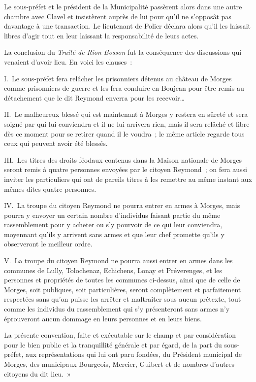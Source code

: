 \documentclass[french,twoside]{book} %
\begin{document}
\noindent Le sous-préfet et le président de la Municipalité passèrent alors dans une autre chambre avec Clavel et insistèrent auprès de lui pour qu’il ne s’opposât pas davantage à une transaction. Le lieutenant de Polier déclara alors qu’il les laissait libres d’agir tout en leur laissant la responsabilité de leurs actes.\par
La conclusion du \emph{Traité de Rion-Bosson} fut la conséquence des discussions qui venaient d’avoir lieu. En voici les clauses :\par
I. Le sous-préfet fera relâcher les prisonniers détenus au château de Morges comme prisonniers de guerre et les fera conduire en Boujean pour être remis au détachement que le dit Reymond enverra pour les recevoir…\par
II. Le malheureux blessé qui est maintenant à Morges y restera en sûreté et sera soigné par qui lui conviendra et il ne lui arrivera rien, mais il sera relâché et libre dès ce moment pour se retirer quand il le voudra ; le même article regarde tous ceux qui peuvent avoir été blessés.\par
III. Les titres des droits féodaux contenus dans la Maison nationale de Morges seront remis à quatre personnes envoyées par le citoyen Reymond ; on fera aussi inviter les particuliers qui ont de pareils titres à les remettre au même instant aux mêmes dites quatre personnes.\par
IV. La troupe du citoyen Reymond ne pourra entrer en armes à Morges, mais pourra y envoyer un certain nombre d’individus faisant partie du même rassemblement pour y acheter ou s’y pourvoir de ce qui leur conviendra, moyennant qu’ils y arrivent sans armes et que leur chef promette qu’ils y observeront le meilleur ordre.\par
V. La troupe du citoyen Reymond ne pourra aussi entrer en armes dans les communes de Lully, Tolochenaz, Echichens, Lonay et Préverenges, et les personnes et propriétés de toutes les communes ci-dessus, ainsi que de celle de Morges, soit publiques, soit particulières, seront complètement et parfaitement respectées sans qu’on puisse les arrêter et maltraiter sous aucun prétexte, tout comme les individus du rassemblement qui s’y présenteront sans armes n’y éprouveront aucun dommage en leurs personnes et en leurs biens.\par
La présente convention, faite et exécutable sur le champ et par considération pour le bien public et la tranquillité générale et par égard, de la part du sous-préfet, aux représentations qui lui ont paru fondées, du Président municipal de Morges, des municipaux Bourgeois, Mercier, Guibert et de nombres d’autres citoyens du dit lieu. »\par
\end{document}

